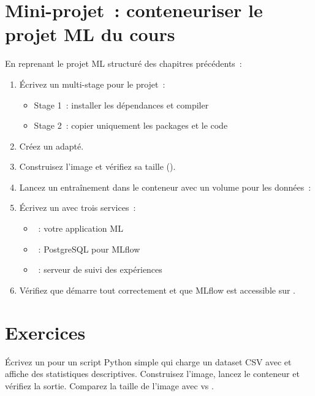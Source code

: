 \section{Mini-projet~: conteneuriser le projet ML du cours}
\label{sec:mini-project-ch7}

\begin{miniprojet}[title=\textbf{Mini-projet 7~: Conteneurisation compl\`ete}]
En reprenant le projet ML structur\'e des chapitres pr\'ec\'edents~:
\begin{enumerate}
  \item \'Ecrivez un  multi-stage pour le projet~:
    \begin{itemize}
      \item Stage 1~: installer les d\'ependances et compiler
      \item Stage 2~: copier uniquement les packages et le code
    \end{itemize}
  \item Cr\'eez un  adapt\'e.
  \item Construisez l'image et v\'erifiez sa taille
    ().
  \item Lancez un entra\^inement dans le conteneur avec un volume
    pour les donn\'ees~: 
  \item \'Ecrivez un  avec trois services~:
    \begin{itemize}
      \item {}~: votre application ML
      \item {}~: PostgreSQL pour MLflow
      \item {}~: serveur de suivi des exp\'eriences
    \end{itemize}
  \item V\'erifiez que  d\'emarre tout
    correctement et que MLflow est accessible sur
    .
\end{enumerate}
\end{miniprojet}

\section{Exercices}
\label{sec:exercises-ch7}

\begin{exercice}
\'Ecrivez un  pour un script Python simple qui charge un
dataset CSV avec  et affiche des statistiques descriptives.
Construisez l'image, lancez le conteneur et v\'erifiez la sortie.
Comparez la taille de l'image avec  vs
.
\end{exercice}

